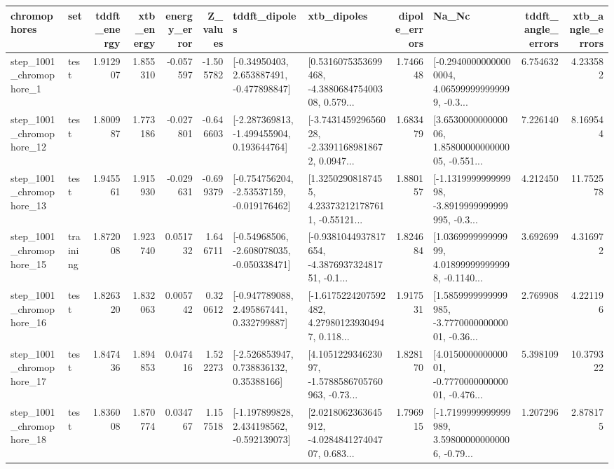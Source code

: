 \begin{tabular}{llrrrrllrlrr}
\toprule
             chromophores &       set &  tddft\_energy &  xtb\_energy &  energy\_error &  Z\_values &                               tddft\_dipoles &                                        xtb\_dipoles &  dipole\_errors &                                              Na\_Nc &  tddft\_angle\_errors &  xtb\_angle\_errors \\
\midrule
  step\_1001\_chromophore\_1 &      test &      1.912907 &    1.855310 &     -0.057597 & -1.505782 &    [-0.34950403, 2.653887491, -0.477898847] &  [0.5316075353699468, -4.388068475400308, 0.579... &       1.746648 &  [-0.29400000000000004, 4.065999999999999, -0.3... &            6.754632 &          4.233582 \\
 step\_1001\_chromophore\_12 &      test &      1.800987 &    1.773186 &     -0.027801 & -0.646603 &   [-2.287369813, -1.499455904, 0.193644764] &  [-3.743145929656028, -2.33911689818672, 0.0947... &       1.683479 &  [3.653000000000006, 1.8580000000000005, -0.551... &            7.226140 &          8.169544 \\
 step\_1001\_chromophore\_13 &      test &      1.945561 &    1.915930 &     -0.029631 & -0.699379 &   [-0.754756204, -2.53537159, -0.019176462] &  [1.32502908187455, 4.233732121787611, -0.55121... &       1.880157 &  [-1.131999999999998, -3.8919999999999995, -0.3... &            4.212450 &         11.752578 \\
 step\_1001\_chromophore\_15 &  training &      1.872008 &    1.923740 &      0.051732 &  1.646711 &   [-0.54968506, -2.608078035, -0.050338471] &  [-0.9381044937817654, -4.387693732481751, -0.1... &       1.824684 &  [1.036999999999999, 4.018999999999998, -0.1140... &            3.692699 &          4.316972 \\
 step\_1001\_chromophore\_16 &      test &      1.826320 &    1.832063 &      0.005742 &  0.320612 &    [-0.947789088, 2.495867441, 0.332799887] &  [-1.6175224207592482, 4.279801239304947, 0.118... &       1.917531 &  [1.5859999999999985, -3.777000000000001, -0.36... &            2.769908 &          4.221196 \\
 step\_1001\_chromophore\_17 &      test &      1.847436 &    1.894853 &      0.047416 &  1.522273 &     [-2.526853947, 0.738836132, 0.35388166] &  [4.105122934623097, -1.5788586705760963, -0.73... &       1.828170 &  [4.015000000000001, -0.777000000000001, -0.476... &            5.398109 &         10.379322 \\
 step\_1001\_chromophore\_18 &      test &      1.836008 &    1.870774 &      0.034767 &  1.157518 &   [-1.197899828, 2.434198562, -0.592139073] &  [2.0218062363645912, -4.028484127404707, 0.683... &       1.796915 &  [-1.7199999999999989, 3.598000000000006, -0.79... &            1.207296 &          2.878175 \\

\end{tabular}
